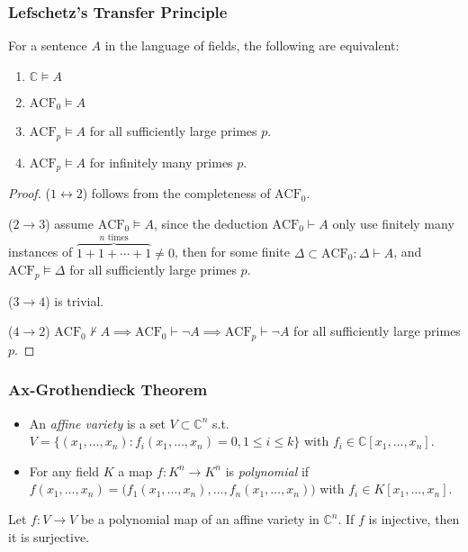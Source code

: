 \documentclass[UTF8,11pt,colorlinks,compress,openany]{beamer}%
\begin{document}
\begin{frame}\frametitle{Lefschetz's Transfer Principle}\vspace*{-3pt}
\begin{theorem}
For a sentence $A$ in the language of fields, the following are equivalent:
\begin{enumerate}
	\item $\mathbb{C}\vDash A$
	\item $\mathrm{ACF}_0\vDash A$
	\item $\mathrm{ACF}_p\vDash A$ for all sufficiently large primes $p$.
	\item $\mathrm{ACF}_p\vDash A$ for infinitely many primes $p$.
\end{enumerate}
\end{theorem}\vspace*{-2pt}
\begin{proof}
($1\leftrightarrow 2$) follows from the completeness of $\mathrm{ACF}_0$.

($2\to 3$) assume
$\mathrm{ACF}_0\vDash A$, since the deduction $\mathrm{ACF}_0\vdash A$ only use finitely many instances of $\overbrace{1 + 1 + \cdots + 1}^{n\text{ times}} \ne 0$, then for some finite $\Delta\subset\mathrm{ACF}_0: \Delta\vdash A$, and $\mathrm{ACF}_p\vDash\Delta$ for all sufficiently large primes $p$.

($3\to 4$) is trivial.

($4\to 2$) $\mathrm{ACF}_0\nvdash A\implies\mathrm{ACF}_0\vdash\neg A\implies\mathrm{ACF}_p\vdash\neg A$ for all sufficiently large primes $p$.
\end{proof}
\end{frame}

\begin{frame}\frametitle{Ax-Grothendieck Theorem}
\begin{itemize}
	\item An \emph{affine variety} is a set $V\subset\mathbb{C}^n$ s.t. $V=\big\{(x_1,\dots,x_n): f_i(x_1,\dots,x_n)=0, 1\leq i\leq k\big\}$ with $f_i\in\mathbb{C}[x_1,\dots,x_n]$.
	\item For any field $K$ a map $f: K^n\to K^n$ is \emph{polynomial} if $f(x_1,\dots,x_n)=\big(f_1(x_1,\dots,x_n),\dots,f_n(x_1,\dots,x_n)\big)$ with $f_i\in K[x_1,\dots,x_n]$.
\end{itemize}
	\begin{theorem}
		Let $f: V\to V$ be a polynomial map of an affine variety in $\mathbb{C}^n$. If $f$ is injective, then it is surjective.
	\end{theorem}
\end{frame}
\end{document}
